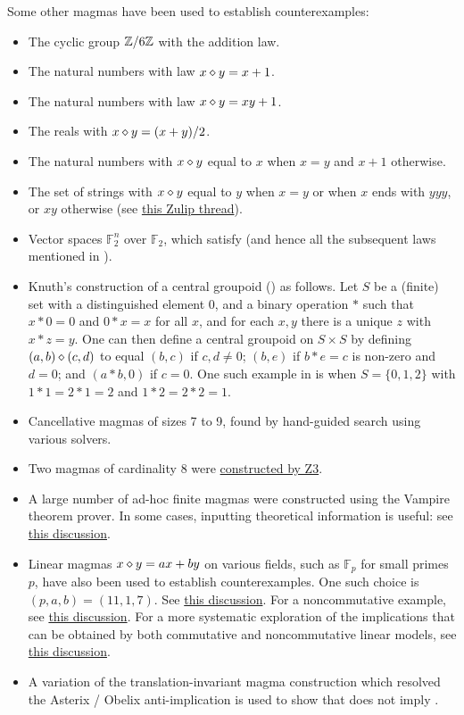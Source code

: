 Some other magmas have been used to establish counterexamples:
\begin{itemize}
  \item The cyclic group $\mathbb{Z}/6\mathbb{Z}$ with the addition law.
  \item The natural numbers with law $x \diamond y = x+1$.
  \item The natural numbers with law $x \diamond y = xy+1$.
  \item The reals with $x \diamond y = (x+y)/2$.
  \item The natural numbers with $x \diamond y$ equal to $x$ when $x=y$ and $x+1$ otherwise.
  \item The set of strings with $x \diamond y$ equal to $y$ when $x=y$ or when $x$ ends with $yyy$, or $xy$ otherwise (see \href{https://leanprover.zulipchat.com/#narrow/stream/458659-Equational/topic/3102.20does.20not.20imply.203176/near/474656031}{this Zulip thread}).
  \item Vector spaces ${\mathbb F}_2^n$ over ${\mathbb F}_2$, which satisfy  (and hence all the subsequent laws mentioned in ).
  \item Knuth's construction \cite{knuth} of a central groupoid () as follows.  Let $S$ be a (finite) set with a distinguished element $0$, and a binary operation $*$ such that $x*0=0$ and $0*x=x$   for all $x$, and for each $x,y$ there is a unique $z$ with $x*z=y$.  One can then define a central groupoid on $S \times S$ by defining $(a,b) \diamond (c,d)$ to equal $(b,c)$ if $c,d \neq 0$; $(b,e)$ if $b*e=c$ is non-zero and $d=0$; and $(a*b,0)$ if $c=0$.  One such example in \cite{knuth} is when $S = \{0,1,2\}$ with $1*1=2*1=2$ and $1*2=2*2=1$.
  \item Cancellative magmas of sizes 7 to 9, found by hand-guided search using various solvers.
  \item Two magmas of cardinality $8$ were \href{https://leanprover.zulipchat.com/#narrow/stream/458659-Equational/topic/using.20z3/near/474918100}{constructed by Z3}.
  \item A large number of ad-hoc finite magmas were constructed using the Vampire theorem prover.  In some cases, inputting theoretical information is useful: see \href{https://leanprover.zulipchat.com/#narrow/channel/458659-Equational/topic/Outstanding.20equations.2C.20v1/near/478066872}{this discussion}.
  \item Linear magmas $x\diamond y = ax+by$ on various fields, such as ${\mathbb F}_p$ for small primes $p$, have also been used to establish counterexamples.  One such choice is $(p,a,b) = (11,1,7)$. See \href{https://leanprover.zulipchat.com/#narrow/stream/458659-Equational/topic/An.20old.20new.20idea}{this discussion}.  For a noncommutative example, see \href{https://leanprover.zulipchat.com/#narrow/channel/458659-Equational/topic/Outstanding.20equations.2C.20v1/near/477928995.2E01}{this discussion}. For a more systematic exploration of the implications that can be obtained by both commutative and noncommutative linear models, see \href{https://leanprover.zulipchat.com/#narrow/channel/458659-Equational/topic/Non-commutative.20linear.20implications}{this discussion}.
  \item A variation of the translation-invariant magma construction which resolved the Asterix / Obelix anti-implication is used to show that  does not imply .
\end{itemize}
